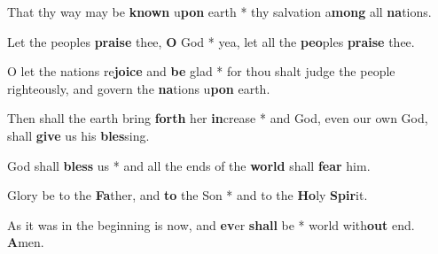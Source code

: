 \begin{multicols}{2}
	That thy way may be \textbf{known} u\textbf{pon} earth * thy salvation a\textbf{mong} all \textbf{na}tions.
	
	Let the peoples \textbf{praise} thee, \textbf{O} God * yea, let all the \textbf{peo}ples \textbf{praise} thee.
	
	O let the nations re\textbf{joice} and \textbf{be} glad * for thou shalt judge the people righteously, and govern the \textbf{na}tions u\textbf{pon} earth.
	
	Then shall the earth bring \textbf{forth} her \textbf{in}crease * and God, even our own God, shall \textbf{give} us his \textbf{bles}sing.
	
	God shall \textbf{bless} us * and all the ends of the \textbf{world} shall \textbf{fear} him.
	
	Glory be to the \textbf{Fa}ther, and \textbf{to} the Son * and to the \textbf{Ho}ly \textbf{Spir}it.
	
	As it was in the beginning is now, and \textbf{ev}er \textbf{shall} be * world with\textbf{out} end. \textbf{A}men.
\end{multicols}